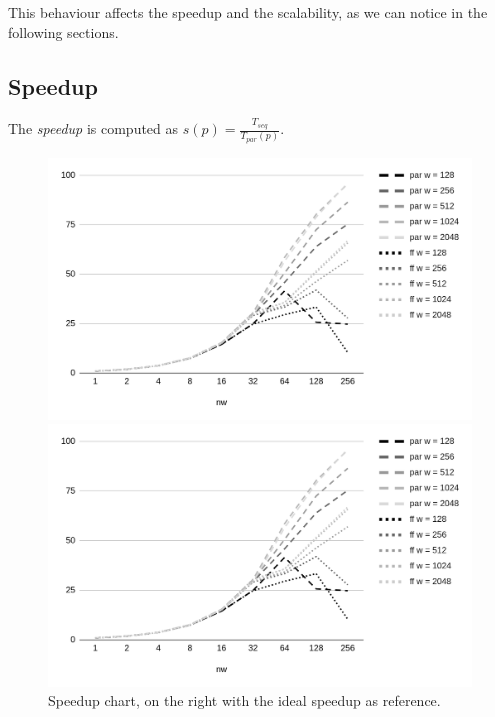 This behaviour affects the speedup and the scalability, as we can notice in the following sections.



\subsection{Speedup}
The \textit{speedup} is computed as $s(p) = \frac{T_{seq}}{T_{par}(p)}$.

\begin{figure}[H]
    \centering
    \begin{minipage}{.68\linewidth}
        \includegraphics[width=\linewidth]{assets/speedup}
    \end{minipage}
    \begin{minipage}{.3\linewidth}
        \includegraphics[width=\linewidth]{assets/speedup_ideal}
    \end{minipage}
    \caption{Speedup chart, on the right with the ideal speedup as reference.}
    \label{fig:speedup}
\end{figure}

